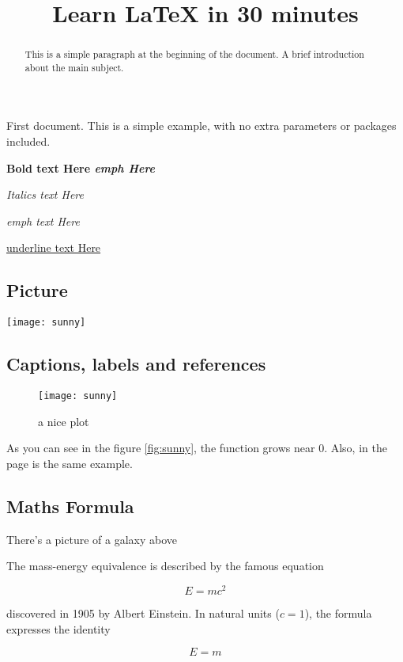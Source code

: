 \documentclass{article}
\title{Learn LaTeX in 30 minutes}
\begin{document}
\maketitle

\tableofcontents

\begin{abstract}
This is a simple paragraph at the beginning of the 
document. A brief introduction about the main subject.
\end{abstract}
\newpage
\section{ }
First document. This is a simple example, with no 
extra parameters or packages included.

\textbf{Bold text Here \emph{emph Here}}

\textit{Italics text Here}

\emph{emph text Here}

\underline{underline text Here}

\subsection{Picture}
\texttt{[image: sunny]}
\subsection{Captions, labels and references}
\begin{figure}[h]
    \centering
    \texttt{[image: sunny]}
    \caption{a nice plot}
    \label{fig:mesh1}
\end{figure}
 
As you can see in the figure \ref{fig:sunny}, the 
function grows near 0. Also, in the page \pageref{fig:sunny} 
is the same example.

\subsection{Maths Formula}
There's a picture of a galaxy above

The mass-energy equivalence is described by the famous equation
 
\[E=mc^2 \]
 
discovered in 1905 by Albert Einstein. 
In natural units ($c = 1$), the formula expresses the identity
 
\begin{equation}
E=m
\end{equation}
\end{document}
